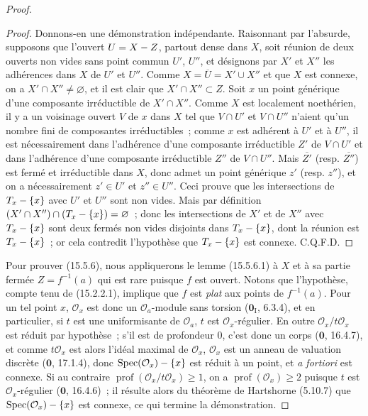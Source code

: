 \begin{proof}
\begin{proof}
Donnons-en une démonstration indépendante. Raisonnant par l'absurde, supposons que l'ouvert $U=X- Z$, partout dense dans $X$, soit réunion de deux ouverts non vides sans point commun $U'$, $U''$, et désignons par $X'$ et $X''$ les adhérences dans $X$ de $U'$ et $U''$. Comme $X=\overline{U}=X'\cup X''$ et que $X$ est connexe, on a $X'\cap X''\ne\varnothing$, et il est clair que $X'\cap X''\subset Z$. Soit $x$ un point générique d'une composante irréductible de $X'\cap X''$. Comme $X$ est localement noethérien, il y a un voisinage ouvert $V$ de $x$ dans $X$ tel que $V\cap U'$ et $V\cap U''$ n'aient qu'un nombre fini de composantes irréductibles~; comme $x$ est adhérent à $U'$ et à $U''$, il est nécessairement dans l'adhérence d'une composante irréductible $Z'$ de $V\cap U'$ et dans l'adhérence d'une composante irréductible $Z''$ de $V\cap U''$. Mais $\overline{Z'}$ (resp. $\overline{Z''}$) est fermé et irréductible dans $X$, donc admet un point générique $z'$ (resp. $z''$), et on a nécessairement $z'\in U'$ et $z''\in U''$. Ceci prouve que les intersections de $T_x-\{x\}$ avec $U'$ et $U''$ sont non vides. Mais par définition $(X'\cap X'')\cap(T_x-\{x\})=\varnothing$~; donc les intersections de $X'$ et de $X''$ avec $T_x-\{x\}$ sont deux fermés non vides disjoints dans $T_x-\{x\}$, dont la réunion est $T_x-\{x\}$~; or cela contredit l'hypothèse que $T_x-\{x\}$ est connexe. C.Q.F.D.
\end{proof}
Pour prouver (15.5.6), nous appliquerons le lemme (15.5.6.1) à $X$ et à sa partie fermée $Z=f^{-1}(a)$ qui est rare puisque $f$ est ouvert. Notons que l'hypothèse, compte tenu de (15.2.2.1), implique que $f$ est \emph{plat} aux points de $f^{-1}(a)$. Pour un tel point $x$, $\mathcal O_x$ est donc un $\mathcal O_a$-module sans torsion ($\mathbf{0}_{\mathrm I}$, 6.3.4), et en particulier, si $t$ est une uniformisante de $\mathcal O_a$, $t$ est $\mathcal O_x$-régulier. En outre $\mathcal O_x/t\mathcal O_x$ est réduit par hypothèse~; s'il est de profondeur $0$, c'est donc un corps ($\mathbf{0}$, 16.4.7), et comme $t\mathcal O_x$ est alors l'idéal maximal de $\mathcal O_x$, $\mathcal O_x$ est un anneau de valuation discrète ($\mathbf{0}$, 17.1.4), donc $\operatorname{Spec}(\mathcal O_x)-\{x\}$ est réduit à un point, et \emph{a fortiori} est connexe. Si au contraire $\operatorname{prof}(\mathcal O_x/t\mathcal O_x)\geqslant 1$, on a $\operatorname{prof}(\mathcal O_x)\geqslant 2$ puisque $t$ est $\mathcal O_x$-régulier ($\mathbf{0}$, 16.4.6)~; il résulte alors du théorème de Hartshorne (5.10.7) que $\operatorname{Spec}(\mathcal O_x)-\{x\}$ est connexe, ce qui termine la démonstration.
\end{proof}


